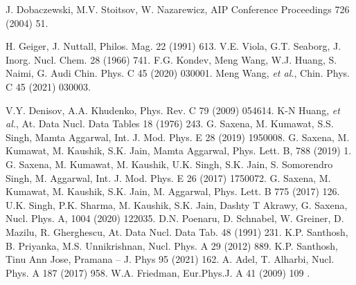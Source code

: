 \documentclass[preprint,10pt]{elsarticle}
\begin{document}
\begin{thebibliography}{00}
  J. Dobaczewski, M.V. Stoitsov, W. Nazarewicz, AIP Conference Proceedings 726 (2004) 51.

 H. Geiger, J. Nuttall, Philos. Mag. 22 (1991) 613.
 V.E. Viola, G.T. Seaborg, J. Inorg. Nucl. Chem. 28 (1966) 741.
 F.G. Kondev, Meng Wang, W.J. Huang, S. Naimi, G. Audi Chin. Phys. C 45 (2020) 030001.
 Meng Wang, \textit{et al.}, Chin. Phys. C 45 (2021) 030003.

 V.Y. Denisov, A.A. Khudenko, Phys. Rev. C 79 (2009) 054614.
 K-N Huang, \textit{et al.}, At. Data Nucl. Data Tables 18 (1976) 243.
  G. Saxena, M. Kumawat, S.S. Singh, Mamta Aggarwal, Int. J. Mod. Phys. E 28 (2019) 1950008.
 G. Saxena, M. Kumawat, M. Kaushik, S.K. Jain, Mamta Aggarwal, Phys. Lett. B, 788 (2019) 1.
 G. Saxena, M. Kumawat, M. Kaushik, U.K. Singh, S.K. Jain, S. Somorendro Singh, M. Aggarwal, Int. J. Mod. Phys. E 26 (2017) 1750072.
 G. Saxena, M. Kumawat, M. Kaushik, S.K. Jain, M. Aggarwal, Phys. Lett. B 775 (2017) 126.
     U.K. Singh, P.K. Sharma, M. Kaushik, S.K. Jain, Dashty T Akrawy, G. Saxena, Nucl. Phys. A, 1004 (2020) 122035.
 D.N. Poenaru, D. Schnabel, W. Greiner, D. Mazilu, R. Gherghescu, At. Data Nucl. Data Tab. 48 (1991) 231.
 K.P. Santhosh, B. Priyanka, M.S. Unnikrishnan, Nucl. Phys. A 29 (2012) 889.
 K.P. Santhosh, Tinu Ann Jose, Pramana – J. Phys 95 (2021) 162.
 A. Adel, T. Alharbi, Nucl. Phys. A 187 (2017) 958.
 W.A. Friedman, Eur.Phys.J. A 41 (2009) 109 .

\end{thebibliography}
\end{document}
